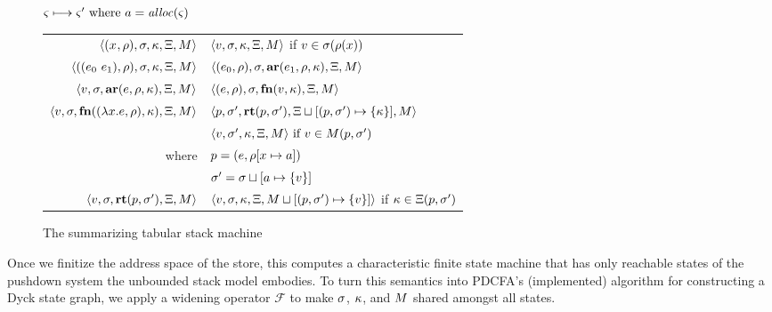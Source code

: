 \documentclass{llncs}
\begin{document}
\begin{figure}
  \centering
  $\varsigma \longmapsto \varsigma' \text{ where } a = \mathit{alloc}(\varsigma)$ \\
  \begin{tabular}{r|l}
    \hline
    $\langle (x^{{}}, \rho), \sigma, \kappa, \Xi, M \rangle$
    &
    $\langle v,\sigma,\kappa, \Xi, M \rangle$ if $v \in \sigma(\rho(x))$
    \\
    $\langle ((e_{0}\ e_{1}){}, \rho), \sigma, \kappa, \Xi, M \rangle$
    &
    $\langle (e_{0}, \rho), \sigma, \mathbf{ar}{}(e_{1},\rho,\kappa), \Xi, M \rangle$
    \\
    $\langle v, \sigma, \mathbf{ar}{}(e,\rho,\kappa), \Xi, M \rangle$
    &
    $\langle (e, \rho), \sigma, \mathbf{fn}{}(v, \kappa), \Xi, M \rangle$
    \\
    $\langle v,\sigma,\mathbf{fn}{}((\lambda{} x. e, \rho), \kappa),\Xi,M \rangle$
    & %
    $\langle p,
          \sigma',
          \mathbf{rt}(p, \sigma'),
          \Xi\sqcup[(p, \sigma') \mapsto \{ \kappa \}],
          M \rangle$
\\
    & $\langle v, \sigma', \kappa, \Xi, M \rangle \text{ if } v \in M(p,\sigma')$
    \\ %
    where & $p = (e, \rho[x \mapsto a])$ \\
          & $\sigma' = \sigma\sqcup[a \mapsto \{ v \}]$
    \\
    $\langle v, \sigma, \mathbf{rt}(p,\sigma'), \Xi, M \rangle$
    &
    $\langle v, \sigma, \kappa, \Xi, M\sqcup[(p, \sigma') \mapsto \{ v \}] \rangle$
    if $\kappa \in \Xi(p, \sigma')$
  \end{tabular}
  \caption{The summarizing tabular stack machine}
  \label{fig:summary-semantics}
\end{figure}

Once we finitize the address space of the store, this computes a
characteristic finite state machine that has only reachable states of
the pushdown system the unbounded stack model embodies.
To turn this semantics into PDCFA's (implemented) algorithm for constructing a Dyck
state graph, we apply a widening operator ${\mathcal F}$ to make $\sigma$, $\kappa$,
and $M$ shared amongst all states.
\end{document}
